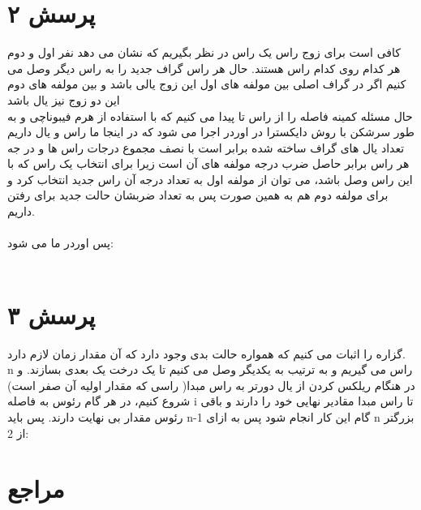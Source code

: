 \documentclass[a4paper]{article}
\begin{document}
\section*{پرسش ۲}
کافی است برای زوج راس
یک راس در نظر بگیریم که نشان می دهد نفر اول و دوم هر کدام روی کدام راس هستند. حال هر راس گراف جدید
 را به راس دیگر 
 وصل می کنیم اگر در گراف اصلی بین مولفه های اول این زوج یالی باشد و بین مولفه های دوم این دو زوج نیز یال باشد\\
 حال مسئله کمینه فاصله را از راس
 تا 
 پیدا می کنیم که با استفاده از هرم فیبوناچی و به طور سرشکن با روش دایکسترا
 در اوردر
 اجرا می شود که در اینجا ما 
 راس و 
 یال داریم\\
 تعداد یال های گراف ساخته شده برابر است با نصف مجموع درجات راس ها و در جه هر راس برابر حاصل ضرب درجه مولفه های آن است زیرا برای انتخاب یک راس که با این راس وصل باشد، می توان از مولفه اول به تعداد درجه آن راس جدید انتخاب کرد و برای مولفه دوم هم به همین صورت پس به تعداد ضربشان حالت جدید برای رفتن داریم.\\
 \\
 پس اوردر ما می شود:\\
 \\
 
\pagebreak
\section*{پرسش ۳}
گزاره را اثبات می کنیم که همواره حالت بدی وجود دارد که آن مقدار زمان لازم دارد.\\
n
راس می گیریم و به ترتیب به یکدیگر وصل می کنیم تا یک درخت یک بعدی بسازند.
و در هنگام ریلکس کردن از یال دورتر به راس مبدا( راسی که مقدار اولیه آن صفر است) شروع کنیم، در هر گام رئوس به فاصله i تا راس مبدا مقادیر نهایی خود را دارند و باقی رئوس مقدار بی نهایت دارند. پس باید n-1 گام این کار انجام شود پس به ازای n بزرگتر از 2:\\
\pagebreak

\section*{مراجع}
\end{document}

